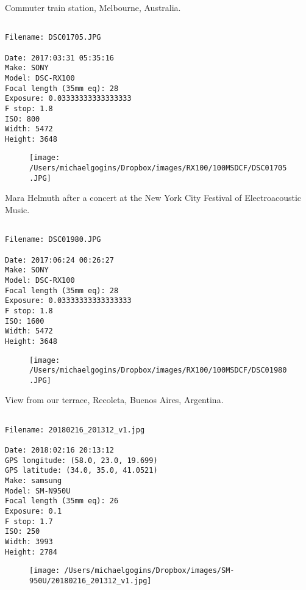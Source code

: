 \clearpage
\onecolumn
\noindent Commuter train station, Melbourne, Australia.
\noindent
\begin{lstlisting}

Filename: DSC01705.JPG

Date: 2017:03:31 05:35:16
Make: SONY
Model: DSC-RX100
Focal length (35mm eq): 28
Exposure: 0.03333333333333333
F stop: 1.8
ISO: 800
Width: 5472
Height: 3648
\end{lstlisting}
\clearpage

\begin{figure}
\texttt{[image: /Users/michaelgogins/Dropbox/images/RX100/100MSDCF/DSC01705.JPG]}
\end{figure}
    
\clearpage
\onecolumn
\noindent Mara Helmuth after a concert at the New York City Festival of Electroacoustic Music.
\noindent
\begin{lstlisting}

Filename: DSC01980.JPG

Date: 2017:06:24 00:26:27
Make: SONY
Model: DSC-RX100
Focal length (35mm eq): 28
Exposure: 0.03333333333333333
F stop: 1.8
ISO: 1600
Width: 5472
Height: 3648
\end{lstlisting}
\clearpage

\begin{figure}
\texttt{[image: /Users/michaelgogins/Dropbox/images/RX100/100MSDCF/DSC01980.JPG]}
\end{figure}
    
\clearpage
\onecolumn
\noindent View from our terrace, Recoleta, Buenos Aires, Argentina.
\noindent
\begin{lstlisting}

Filename: 20180216_201312_v1.jpg

Date: 2018:02:16 20:13:12
GPS longitude: (58.0, 23.0, 19.699)
GPS latitude: (34.0, 35.0, 41.0521)
Make: samsung
Model: SM-N950U
Focal length (35mm eq): 26
Exposure: 0.1
F stop: 1.7
ISO: 250
Width: 3993
Height: 2784
\end{lstlisting}
\clearpage

\begin{figure}
\texttt{[image: /Users/michaelgogins/Dropbox/images/SM-950U/20180216\_201312\_v1.jpg]}
\end{figure}
    
